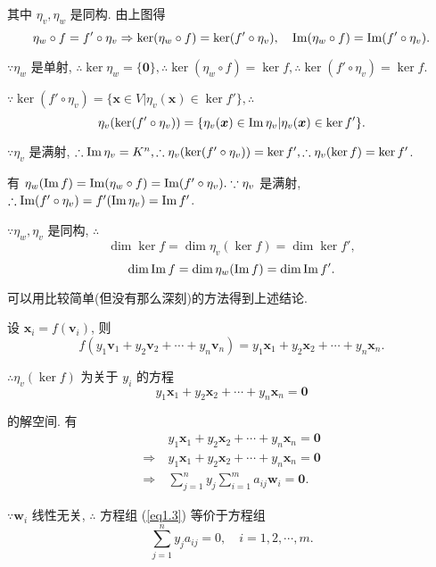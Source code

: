 \documentclass{ctexart}
\begin{document}
其中 $\eta_v,\eta_w$ 是同构. 由上图得
\[\eta_w\circ f=f'\circ\eta_v\Rightarrow\ker(\eta_w\circ f)=\ker(f'\circ\eta_v),\quad\operatorname{Im} (\eta_w\circ f)=\operatorname{Im} (f'\circ\eta_v).\]

$\because\eta_w$ 是单射, $\therefore\ker\eta_w=\{\boldsymbol{0}\},\therefore\ker(\eta_w\circ f)=\ker f,\therefore\ker(f'\circ\eta_v)=\ker f$.

$\because\ker(f'\circ\eta_v)=\{\boldsymbol{x}\in V|\eta_v(\boldsymbol{x})\in\ker f'\},\therefore$
\[\eta_v(\ker(f'\circ\eta_v))=\{\eta_v(\boldsymbol{x})\in\operatorname{Im} \eta_v|\eta_v(\boldsymbol{x})\in\ker f'\}.\]

$\because\eta_v$ 是满射, $\therefore\operatorname{Im} \eta_v=K^n,\therefore\eta_v(\ker(f'\circ\eta_v))=\ker f',\therefore\eta_v(\ker f)=\ker f'$.

有 $\eta_w(\operatorname{Im} f)=\operatorname{Im} (\eta_w\circ f)=\operatorname{Im} (f'\circ\eta_v).\because\eta_v$ 是满射, $\therefore\operatorname{Im} (f'\circ\eta_v)=f'(\operatorname{Im} \eta_v)=\operatorname{Im} f'$.

$\because\eta_w,\eta_v$ 是同构, $\therefore$
\[\dim\ker f=\dim\eta_v(\ker f)=\dim\ker f',\]
\begin{equation}\label{eq1.2}
    \dim\operatorname{Im} f=\dim\eta_w(\operatorname{Im} f)=\dim\operatorname{Im} f'.
\end{equation}

可以用比较简单(但没有那么深刻)的方法得到上述结论.

设 $\boldsymbol{x}_i=f(\boldsymbol{v}_i)$, 则
\[f(y_1\boldsymbol{v}_1+y_2\boldsymbol{v}_2+\cdots+y_n\boldsymbol{v}_n)=y_1\boldsymbol{x}_1+y_2\boldsymbol{x}_2+\cdots+y_n\boldsymbol{x}_n.\]

$\therefore\eta_v(\ker f)$ 为关于 $y_i$ 的方程
\begin{equation}\label{eq1.3}
    y_1\boldsymbol{x}_1+y_2\boldsymbol{x}_2+\cdots+y_n\boldsymbol{x}_n=\boldsymbol{0}
\end{equation}

的解空间. 有
\begin{align*}
    & \ y_1\boldsymbol{x}_1+y_2\boldsymbol{x}_2+\cdots+y_n\boldsymbol{x}_n=\boldsymbol{0} \\
    \Rightarrow & \ y_1\boldsymbol{x}_1+y_2\boldsymbol{x}_2+\cdots+y_n\boldsymbol{x}_n=\boldsymbol{0} \\
    \Rightarrow & \ \sum\limits_{j=1}^ny_j\sum\limits_{i=1}^ma_{ij}\boldsymbol{w}_i=\boldsymbol{0}.
\end{align*}

$\because\boldsymbol{w}_i$ 线性无关, $\therefore$ 方程组 (\ref{eq1.3}) 等价于方程组
\[\sum\limits_{j=1}^ny_ja_{ij}=0,\quad i=1,2,\cdots,m.\]
\end{document}
